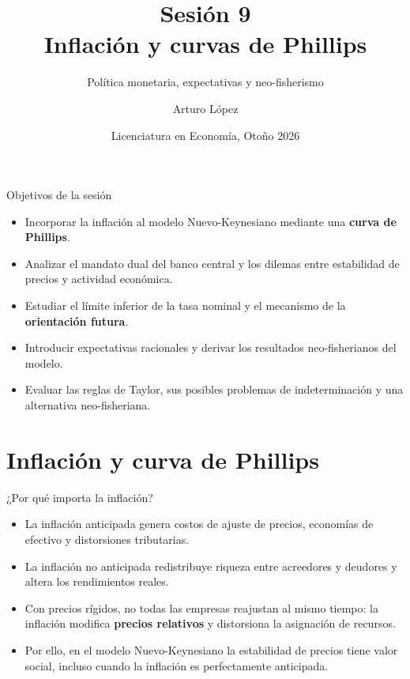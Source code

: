 \documentclass[aspectratio=169,11pt]{beamer}
\title[Macroeconomía II]{Sesión 9 \\ Inflación y curvas de Phillips}
\subtitle{Política monetaria, expectativas y neo-fisherismo}
\author[LECO]{Arturo López}
\institute[CIDE]{Centro de Investigación y Docencia Económicas (CIDE)}
\date[Otoño 2026]{Licenciatura en Economía, Otoño 2026}
\newcommand{\cidehighlight}[1]{\textcolor{CIDEBlue}{\bfseries #1}}
\begin{document}
\begin{frame}
  \titlepage
\end{frame}

\begin{frame}{Objetivos de la sesión}
  \begin{itemize}
    \setlength{\itemsep}{0.60em}
    \item Incorporar la inflación al modelo Nuevo-Keynesiano mediante una \cidehighlight{curva de Phillips}.
    \item Analizar el mandato dual del banco central y los dilemas entre estabilidad de precios y actividad económica.
    \item Estudiar el límite inferior de la tasa nominal y el mecanismo de la \cidehighlight{orientación futura}.
    \item Introducir expectativas racionales y derivar los resultados neo-fisherianos del modelo.
    \item Evaluar las reglas de Taylor, sus posibles problemas de indeterminación y una alternativa neo-fisheriana.
  \end{itemize}
\end{frame}

\section{Inflación y curva de Phillips}

\begin{frame}{¿Por qué importa la inflación?}
  \begin{itemize}
    \setlength{\itemsep}{0.58em}
    \item La inflación anticipada genera costos de ajuste de precios, economías de efectivo y distorsiones tributarias.
    \item La inflación no anticipada redistribuye riqueza entre acreedores y deudores y altera los rendimientos reales.
    \item Con precios rígidos, no todas las empresas reajustan al mismo tiempo: la inflación modifica \textbf{precios relativos} y distorsiona la asignación de recursos.
    \item Por ello, en el modelo Nuevo-Keynesiano la estabilidad de precios tiene valor social, incluso cuando la inflación es perfectamente anticipada.
  \end{itemize}
\end{frame}
\end{document}

